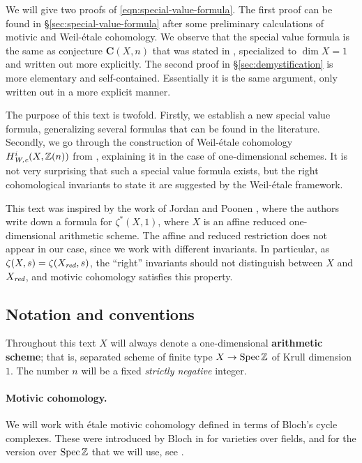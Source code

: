 \documentclass{article}
\numberwithin{equation}{section}
\begin{document}
\vspace{1em}

We will give two proofs of \eqref{eqn:special-value-formula}. The first proof
can be found in \S\ref{sec:special-value-formula} after some preliminary
calculations of motivic and Weil-étale cohomology. We observe that the special
value formula is the same as conjecture $\mathbf{C} (X,n)$ that was stated in
\cite{Beshenov-Weil-etale-2}, specialized to $\dim X = 1$ and written out more
explicitly. The second proof in \S\ref{sec:demystification} is more elementary
and self-contained. Essentially it is the same argument, only written out in a
more explicit manner.

The purpose of this text is twofold. Firstly, we establish a new special value
formula, generalizing several formulas that can be found in the
literature. Secondly, we go through the construction of Weil-étale cohomology
$H^i_{\text{\it W,c}} (X, \mathbb{Z}(n))$ from \cite{Beshenov-Weil-etale-1}, explaining it in the
case of one-dimensional schemes. It is not very surprising that such a special
value formula exists, but the right cohomological invariants to state it are
suggested by the Weil-étale framework.

This text was inspired by the work of Jordan and Poonen
\cite{Jordan-Poonen-2020}, where the authors write down a formula for
$\zeta^* (X,1)$, where $X$ is an affine reduced one-dimensional arithmetic
scheme. The affine and reduced restriction does not appear in our case, since we
work with different invariants. In particular, as
$\zeta (X,s) = \zeta (X_{\text{\it red}}, s)$, the ``right'' invariants should not
distinguish between $X$ and $X_{\text{\it red}}$, and motivic cohomology satisfies this
property.

\subsection*{Notation and conventions}

Throughout this text $X$ will always denote a one-dimensional
\textbf{arithmetic scheme}; that is, separated scheme of finite type
$X \to \operatorname{Spec} \mathbb{Z}$ of Krull dimension $1$. The number $n$ will be a fixed
\emph{strictly negative} integer.

\paragraph{Motivic cohomology.}
We will work with étale motivic cohomology defined in terms of Bloch's cycle
complexes. These were introduced by Bloch in \cite{Bloch-1986} for varieties
over fields, and for the version over $\operatorname{Spec} \mathbb{Z}$ that we will use, see
\cite{Geisser-2004-Dedekind,Geisser-2005}.
\end{document}

